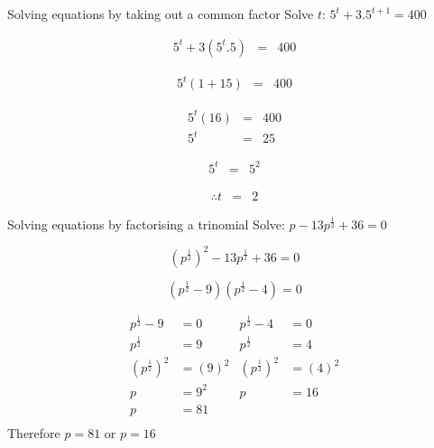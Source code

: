 \begin{wex}
{%
Solving equations by taking out a common factor
}
{%
Solve $t$: 
$ 5^t + 3 . 5^{t+1} = 400 $
}
{%

\begin{eqnarray*}
 5^t + 3 ( 5^t . 5) & = & 400 
\end{eqnarray*}

\begin{eqnarray*}
 5^t(1 + 15) & = & 400 
\end{eqnarray*}



\begin{eqnarray*}
 5^t(16) & = & 400 \\
  5^t & = & 25 
\end{eqnarray*}


\begin{eqnarray*}
  5^t & = & 5^2 
\end{eqnarray*}


\begin{eqnarray*}
\therefore t & = & 2
\end{eqnarray*}

}
\end{wex}

\begin{wex}
{%
Solving equations by factorising a trinomial
}
{%
Solve: $ p-13 p^{\frac{1}{2}} + 36 =  0$
}
{ %


$$ (p^{\frac{1}{2}})^2 -13p^{\frac{1}{2}} + 36 = 0 $$


$$ (p^{\frac{1}{2}} -9)(p^{\frac{1}{2}}-4) = 0 $$


\begin{align*}
p^{\frac{1}{2}} - 9 &= 0			&   p^{\frac{1}{2}} - 4 &= 0		\\
p^{\frac{1}{2}} &= 9				&   p^{\frac{1}{2}} &= 4		\\		
(p^{\frac{1}{2}})^2 &= (9)^2			&   (p^{\frac{1}{2}})^2 &= (4)^2\\
p &= 9^2				&   p &= 16\\
p &= 81					&\\
\end{align*} 
Therefore $p=81$ or $p=16$


}
\end{wex}

